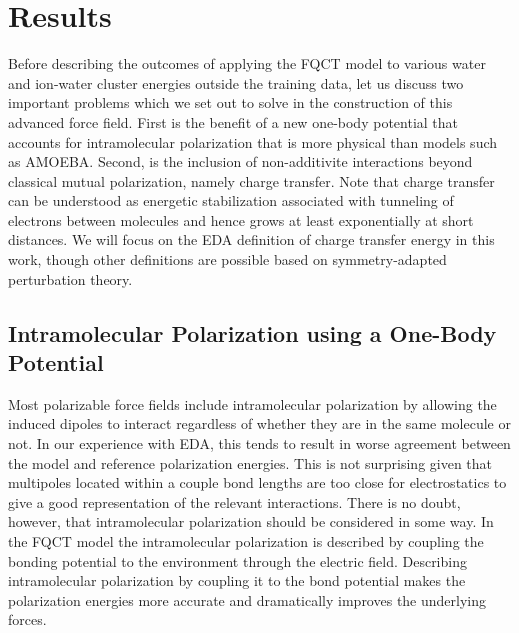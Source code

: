 \documentclass[journal=jctcce,manuscript=article]{achemso}
\begin{document}
\section*{Results}
Before describing the outcomes of applying the FQCT model to various water and
ion-water cluster energies outside the training data, let us discuss two important problems which we set out to solve in the construction of this advanced force field. First is the benefit of a new one-body potential that accounts for intramolecular polarization that is more physical than models such as AMOEBA. Second, is the inclusion of non-additivite interactions beyond classical mutual polarization, namely charge transfer.\cite{herman2023accurate} Note that charge transfer can be understood as energetic stabilization associated with tunneling of electrons between molecules and hence grows at least exponentially at short distances.\cite{misquitta2013charge} We will focus on the EDA definition of charge transfer energy in this work, though other definitions are possible based on symmetry-adapted perturbation theory.\cite{stone2009charge,misquitta2013charge}

\subsection*{Intramolecular Polarization using a One-Body Potential}
Most polarizable force fields include intramolecular polarization by allowing the induced dipoles to interact regardless of whether they are in the same molecule or not. In our experience with EDA, this tends to result in worse agreement between the model and reference polarization energies. This is not surprising given that multipoles located within a couple bond lengths are too close for electrostatics to give a good representation of the relevant interactions. There is no doubt, however, that intramolecular polarization should be considered in some way. In the FQCT model the intramolecular polarization is described by coupling the bonding potential to the environment through the electric field. Describing intramolecular polarization by coupling it to the bond potential makes the polarization energies more accurate and dramatically improves the underlying forces.
\end{document}
